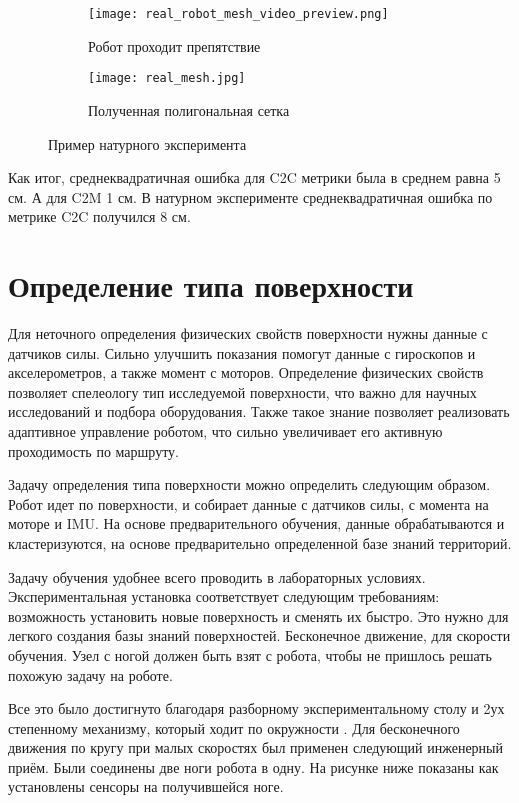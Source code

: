 \begin{figure}[H]
    \begin{subfigure}[t]{0.49\textwidth}
        \centering\texttt{[image: real\_robot\_mesh\_video\_preview.png]}
        \caption{Робот проходит препятствие}
        \label{fig:real_robot_mesh_video_preview.png}
    \end{subfigure}
    \begin{subfigure}[t]{0.49\textwidth}
        \centering\texttt{[image: real\_mesh.jpg]}
        \caption{Полученная полигональная сетка}
        \label{fig:real_mesh.jpg}
    \end{subfigure}
    \caption{Пример натурного эксперимента}
    \label{fig:real_exp_map_creation}
\end{figure}

Как итог, среднеквадратичная ошибка для C2C метрики была в среднем равна 5 см. А для C2M 1 см. В натурном эксперименте среднеквадратичная ошибка по метрике C2C получился 8 см.

\section{Определение типа поверхности}
Для неточного определения физических свойств поверхности нужны данные с датчиков силы. Сильно улучшить показания помогут данные с гироскопов и акселерометров, а также момент с моторов. Определение физических свойств позволяет спелеологу тип исследуемой поверхности, что важно для научных исследований и подбора оборудования. Также такое знание позволяет реализовать адаптивное управление роботом, что сильно увеличивает его активную проходимость по маршруту.

Задачу определения типа поверхности можно определить следующим образом. Робот идет по поверхности, и собирает данные с датчиков силы, с момента на моторе и IMU. На основе предварительного обучения, данные обрабатываются и кластеризуются, на основе предварительно определенной базе знаний территорий.

Задачу обучения удобнее всего проводить в лабораторных условиях. Экспериментальная установка соответствует следующим требованиям: возможность установить новые поверхность и сменять их быстро. Это нужно для легкого создания базы знаний поверхностей. Бесконечное движение, для скорости обучения. Узел с ногой должен быть взят с робота, чтобы не пришлось решать похожую задачу на роботе.

Все это было достигнуто благодаря разборному экспериментальному столу и 2ух степенному механизму, который ходит по окружности . Для бесконечного движения по кругу при малых скоростях был применен следующий инженерный приём. Были соединены две ноги робота в одну. На рисунке ниже  показаны как установлены сенсоры на получившейся ноге.

